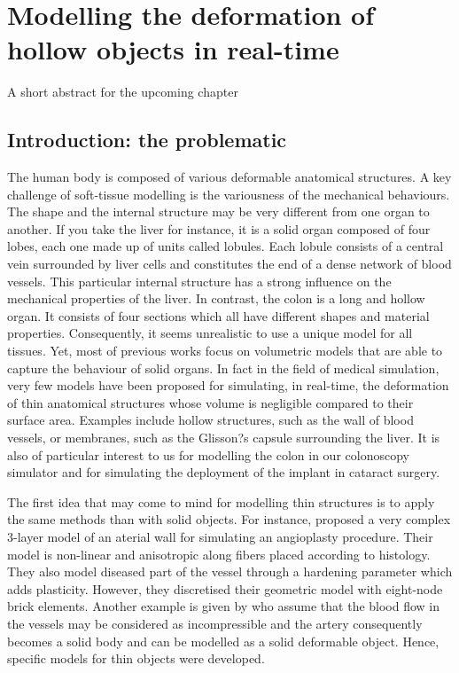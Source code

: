 \chapter{Modelling the deformation of hollow objects in real-time}
\label{chap7}
\begin{shortAbstract}
A short abstract for the upcoming chapter
\end{shortAbstract}


\section{Introduction: the problematic}
The human body is composed of various deformable anatomical structures. A key challenge of soft-tissue modelling is the variousness of the mechanical behaviours. The shape and the internal structure may be very different from one organ to another. If you take the liver for instance, it is a solid organ composed of four lobes, each one made up of units called lobules. Each lobule consists of a central vein surrounded by liver cells and constitutes the end of a dense network of blood vessels. This particular internal structure has a strong influence on the mechanical properties of the liver. In contrast, the colon is a long and hollow organ. It consists of four sections which all have different shapes and material properties. Consequently, it seems unrealistic to use a unique model for all tissues. Yet, most of previous works focus on volumetric models that are able to capture the behaviour of solid organs. In fact in the field of medical simulation, very few models have been proposed for simulating, in real-time, the deformation of thin anatomical structures whose volume is negligible compared to their surface area. Examples include hollow structures, such as the wall of blood vessels, or membranes, such as the Glisson?s capsule surrounding the liver. It is also of particular interest to us for modelling the colon in our colonoscopy simulator and for simulating the deployment of the implant in cataract surgery. 

The first idea that may come to mind for modelling thin structures is to apply the same methods than with solid objects. For instance, \cite{Holzapfel02} proposed a very complex 3-layer model of an aterial wall for simulating an angioplasty procedure. Their model is non-linear and anisotropic along fibers placed according to histology. They also model diseased part of the vessel through a hardening parameter which adds plasticity. However, they discretised their geometric model with eight-node brick elements. Another example is given by \cite{Aloisio04} who assume that the blood flow in the vessels may be considered as incompressible and the artery consequently becomes a solid body and can be modelled as a solid deformable object.  Hence, specific models for thin objects were developed. 

